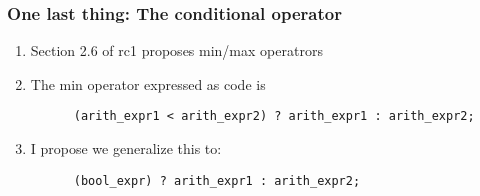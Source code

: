 \documentclass[aspectratio=169]{beamer}
\begin{document}
\begin{frame}[fragile]
  \frametitle{One last thing: The conditional operator}
  \begin{enumerate}
    \item<1-> Section 2.6 of rc1 proposes min/max operatrors
    \item<2-> The min operator expressed as code is
      \begin{scriptsize}
      \begin{verbatim}
      (arith_expr1 < arith_expr2) ? arith_expr1 : arith_expr2;
      \end{verbatim}
    \end{scriptsize}
    \item<3-> I propose we generalize this to:
      \begin{scriptsize}
      \begin{verbatim}
      (bool_expr) ? arith_expr1 : arith_expr2;
      \end{verbatim}
    \end{scriptsize}
  \end{enumerate}
\end{frame}
\end{document}
